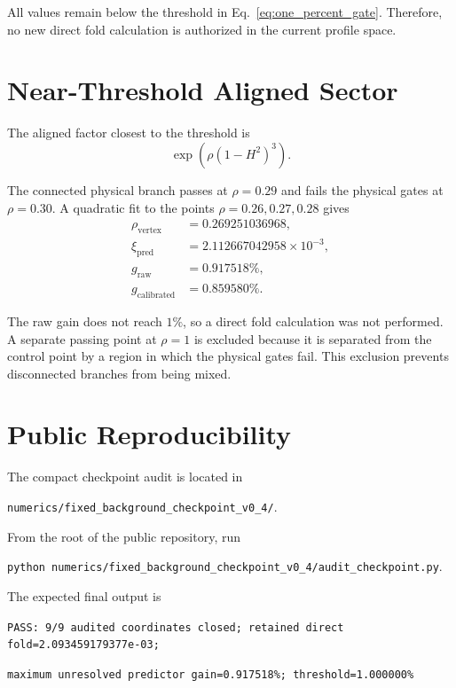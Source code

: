 \documentclass[11pt,a4paper]{article}
\newcommand{\host}{H}
\begin{document}
All values remain below the threshold in Eq.~\eqref{eq:one_percent_gate}. Therefore, no new direct fold calculation is authorized in the current profile space.

\section{Near-Threshold Aligned Sector}

The aligned factor closest to the threshold is
\begin{equation}
\exp\!\left(\rho\left(1-\host^2\right)^3\right).
\end{equation}

The connected physical branch passes at $\rho=0.29$ and fails the physical gates at $\rho=0.30$. A quadratic fit to the points $\rho=0.26,0.27,0.28$ gives
\begin{align}
\rho_{\mathrm{vertex}} &= 0.269251036968, \\
\xi_{\mathrm{pred}} &= 2.112667042958\times10^{-3}, \\
g_{\mathrm{raw}} &= 0.917518\%, \\
g_{\mathrm{calibrated}} &= 0.859580\%.
\end{align}

The raw gain does not reach $1\%$, so a direct fold calculation was not performed. A separate passing point at $\rho=1$ is excluded because it is separated from the control point by a region in which the physical gates fail. This exclusion prevents disconnected branches from being mixed.

\section{Public Reproducibility}

The compact checkpoint audit is located in
\begin{center}
\texttt{numerics/fixed\_background\_checkpoint\_v0\_4/}.
\end{center}

From the root of the public repository, run
\begin{center}
\texttt{python numerics/fixed\_background\_checkpoint\_v0\_4/audit\_checkpoint.py}.
\end{center}

The expected final output is
\begin{center}
\small
\texttt{PASS: 9/9 audited coordinates closed; retained direct fold=2.093459179377e-03;}

\texttt{maximum unresolved predictor gain=0.917518\%; threshold=1.000000\%}
\end{center}
\end{document}
